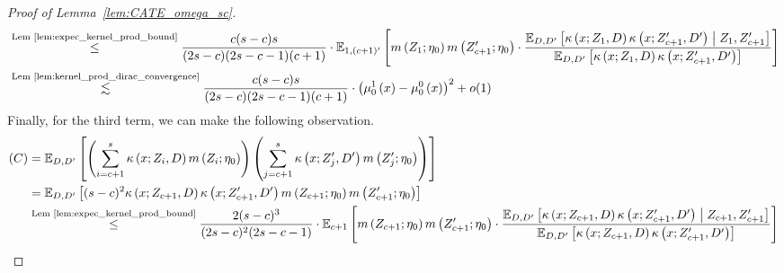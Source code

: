 \begin{proof}[Proof of Lemma~\ref{lem:CATE_omega_sc}]
\begin{equation}
\begin{aligned}
            & \overset{\text{Lem \ref{lem:expec_kernel_prod_bound}}}{\leq} \frac{c(s-c)s}{(2s - c)(2s-c-1)(c+1)} \cdot \mathbb{E}_{1, (c+1)^{\prime}}\left[m\left(Z_{1}; \eta_{0}\right) m\left(Z_{c+1}^{\prime}; \eta_{0}\right)\cdot \frac{\mathbb{E}_{D, D^{\prime}}\left[\kappa\left(x; Z_{1}, D\right)\kappa\left(x; Z_{c+1}^{\prime}, D^{\prime}\right) \; \middle| \; Z_{1}, Z_{c+1}^{\prime}\right]}{\mathbb{E}_{D, D^{\prime}}\left[\kappa\left(x; Z_{1}, D\right)\kappa\left(x; Z_{c+1}^{\prime}, D^{\prime}\right)\right]}\right]\\
			& \overset{\text{Lem \ref{lem:kernel_prod_dirac_convergence}}}{\lesssim} 
            \frac{c(s-c)s}{(2s - c)(2s-c-1)(c+1)} \cdot \left(\mu_{0}^{1}\left(x\right) - \mu_{0}^{0}\left(x\right)\right)^2 + o(1)
		\end{aligned}
	\end{equation}
    Finally, for the third term, we can make the following observation.
	\begin{equation}
		\begin{aligned}
			(C)
			& = \E_{D, D^{\prime}}\left[\left(\sum_{i = c + 1}^{s} \kappa\left(x; Z_{i}, D\right) m\left(Z_{i}; \eta_{0}\right)\right)
            \left(\sum_{j = c + 1}^{s} \kappa\left(x; Z_{j}^{\prime}, D^{\prime}\right) m\left(Z_{j}^{\prime}; \eta_{0}\right)\right)\right] \\
			& = \E_{D, D^{\prime}}\left[(s-c)^2 \kappa\left(x; Z_{c+1}, D\right)\kappa\left(x; Z_{c+1}^{\prime}, D^{\prime}\right)
			m\left(Z_{c+1}; \eta_{0}\right)  m\left(Z_{c+1}^{\prime}; \eta_{0}\right)\right] \\
			& \overset{\text{Lem \ref{lem:expec_kernel_prod_bound}}}{\leq}
            \frac{2(s-c)^{3}}{(2s-c)^{2}(2s-c-1)} \cdot \E_{c+1}\left[m\left(Z_{c+1}; \eta_{0}\right)  m\left(Z_{c+1}^{\prime}; \eta_{0}\right)
            \cdot \frac{\E_{D, D^{\prime}}\left[\kappa\left(x; Z_{c+1}, D\right)\kappa\left(x; Z_{c+1}^{\prime}, D^{\prime}\right) \; \middle| \; Z_{c+1}, Z_{c+1}^{\prime}\right]}{\E_{D, D^{\prime}}\left[\kappa\left(x; Z_{c+1}, D\right)\kappa\left(x; Z_{c+1}^{\prime}, D^{\prime}\right)\right]}\right]\\

\end{aligned}
\end{equation}
\end{proof}
